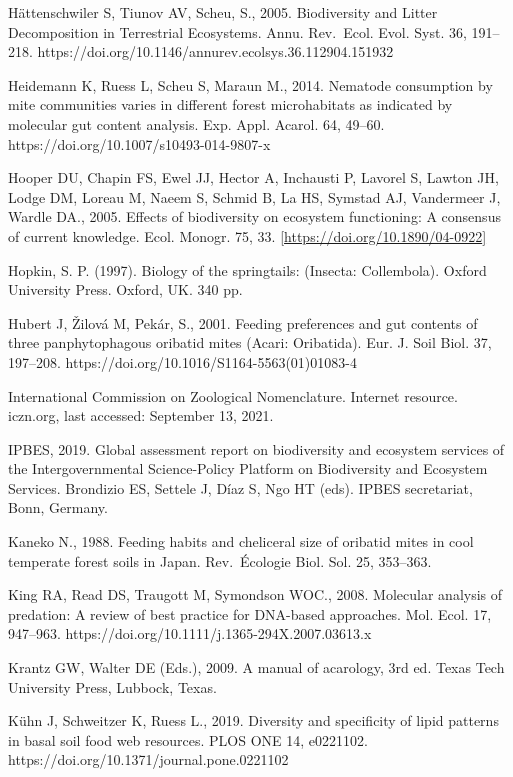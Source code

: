 \documentclass[10pt,oneside]{article}
\begin{document}
Hättenschwiler S, Tiunov AV, Scheu, S., 2005. Biodiversity and Litter
Decomposition in Terrestrial Ecosystems. Annu. Rev.~Ecol. Evol. Syst.
36, 191--218. https://doi.org/10.1146/annurev.ecolsys.36.112904.151932

Heidemann K, Ruess L, Scheu S, Maraun M., 2014. Nematode consumption by
mite communities varies in different forest microhabitats as indicated
by molecular gut content analysis. Exp. Appl. Acarol. 64, 49--60.
https://doi.org/10.1007/s10493-014-9807-x

Hooper DU, Chapin FS, Ewel JJ, Hector A, Inchausti P, Lavorel S, Lawton
JH, Lodge DM, Loreau M, Naeem S, Schmid B, La HS, Symstad AJ, Vandermeer
J, Wardle DA., 2005. Effects of biodiversity on ecosystem functioning: A
consensus of current knowledge. Ecol. Monogr. 75, 33.
\href{https://doi.org/10.1890/04-0922}{{[}https://doi.org/10.1890/04-0922{]}}

Hopkin, S. P. (1997). Biology of the springtails: (Insecta: Collembola).
Oxford University Press. Oxford, UK. 340 pp.

Hubert J, Žilová M, Pekár, S., 2001. Feeding preferences and gut
contents of three panphytophagous oribatid mites (Acari: Oribatida).
Eur. J. Soil Biol. 37, 197--208.
https://doi.org/10.1016/S1164-5563(01)01083-4

International Commission on Zoological Nomenclature. Internet resource.
iczn.org, last accessed: September 13, 2021.

IPBES, 2019. Global assessment report on biodiversity and ecosystem
services of the Intergovernmental Science-Policy Platform on
Biodiversity and Ecosystem Services. Brondizio ES, Settele J, Díaz S,
Ngo HT (eds). IPBES secretariat, Bonn, Germany.

Kaneko N., 1988. Feeding habits and cheliceral size of oribatid mites in
cool temperate forest soils in Japan. Rev.~Écologie Biol. Sol. 25,
353--363.

King RA, Read DS, Traugott M, Symondson WOC., 2008. Molecular analysis
of predation: A review of best practice for DNA-based approaches. Mol.
Ecol. 17, 947--963. https://doi.org/10.1111/j.1365-294X.2007.03613.x

Krantz GW, Walter DE (Eds.), 2009. A manual of acarology, 3rd ed. Texas
Tech University Press, Lubbock, Texas.

Kühn J, Schweitzer K, Ruess L., 2019. Diversity and specificity of lipid
patterns in basal soil food web resources. PLOS ONE 14, e0221102.
https://doi.org/10.1371/journal.pone.0221102
\end{document}
